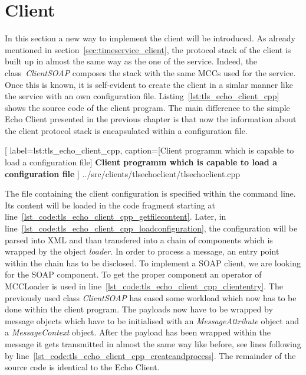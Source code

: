 \clearpage
\section{Client}

In this section a new way to implement the client will be introduced. As already mentioned in section~\ref{sec:timeservice_client}, the protocol stack of the client is built up in almost the same way as the one of the service. Indeed, the class~\textit{ClientSOAP} composes the stack with the same MCCs used for the service. Once this is known, it is self-evident to create the client in a simlar manner like the service with an own configuration file.
Listing~\ref{lst:tls_echo_client_cpp} shows the source code of the client program. The main difference to the simple Echo Client presented in the previous chapter is that now the information about the client protocol stack is encapsulated within a configuration file.\\

	[
	label=lst:tls_echo_client_cpp,
	caption={[Client programm which is capable to load a configuration file]
	\textbf{Client programm which is capable to load a configuration file}}
	]
{../src/clients/tlsechoclient/tlsechoclient.cpp}


The file containing the client configuration is specified within the command line. 
Its content will be loaded in the code fragment starting at line~\ref{lst_code:tls_echo_client_cpp_getfilecontent}. 
Later, in line~\ref{lst_code:tls_echo_client_cpp_loadconfiguration}, the configuration will be parsed into XML and than transfered into a chain of components which is wrapped by the object \textit{loader}. In order to process a message, an entry point within the chain has to be disclosed. To implement a SOAP client, we are looking for the SOAP component. 
To get the proper component an operator of MCCLoader is used in line~\ref{lst_code:tls_echo_client_cpp_cliententry}.
The previously used class \textit{ClientSOAP} has eased some workload which now has to be done within the client program.
The payloads now have to be wrapped by message objects which have to be initialised with an \textit{MessageAttribute} object and a \textit{MessageContext} object. After the payload has been wrapped within the message it gets transmitted in almost the same way like before, see lines following by line~\ref{lst_code:tls_echo_client_cpp_createandprocess}. The remainder of the source code is identical to the Echo Client.\\





